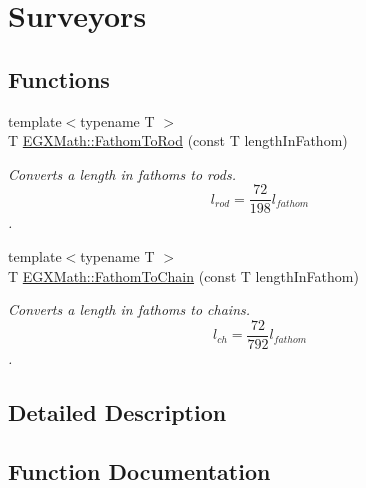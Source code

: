 \hypertarget{group___e_g_x_math-_conversions-_length_conversions-_imperial-_fathom-_surveyors}{}\section{Surveyors}
\label{group___e_g_x_math-_conversions-_length_conversions-_imperial-_fathom-_surveyors}
\subsection*{Functions}
\begin{DoxyCompactItemize}
\item 
{\footnotesize template$<$typename T $>$ }\\T \mbox{\hyperlink{group___e_g_x_math-_conversions-_length_conversions-_imperial-_fathom-_surveyors_ga6afd3032ea722bf44ba979d3e37a2dc2}{E\+G\+X\+Math\+::\+Fathom\+To\+Rod}} (const T length\+In\+Fathom)
\begin{DoxyCompactList}\small\item\em Converts a length in fathoms to rods. \[ l_{rod}= \frac{72}{198} l_{fathom} \]. \end{DoxyCompactList}\item 
{\footnotesize template$<$typename T $>$ }\\T \mbox{\hyperlink{group___e_g_x_math-_conversions-_length_conversions-_imperial-_fathom-_surveyors_ga504644c4cd53f24ae0ce337136975acf}{E\+G\+X\+Math\+::\+Fathom\+To\+Chain}} (const T length\+In\+Fathom)
\begin{DoxyCompactList}\small\item\em Converts a length in fathoms to chains. \[ l_{ch}= \frac{72}{792} l_{fathom} \]. \end{DoxyCompactList}\end{DoxyCompactItemize}


\subsection{Detailed Description}


\subsection{Function Documentation}
\mbox{\label{group___e_g_x_math-_conversions-_length_conversions-_imperial-_fathom-_surveyors_ga504644c4cd53f24ae0ce337136975acf}} 
